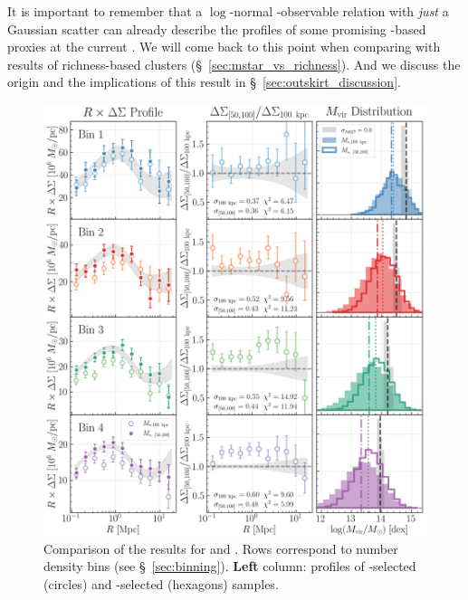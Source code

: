 \documentclass[fleqn,usenatbib,useAMS]{mnras}
\begin{document}
    It is important to remember that a $\log$-normal \mvir{}-observable relation with \emph{just} a
    Gaussian scatter can already describe the \dsigma{} profiles of some promising \mstar{}-based
    \mvir{} proxies at the current \snratio{}.
    We will come back to this point when comparing with \topn{} results of richness-based 
    clusters (\S\ \ref{sec:mstar_vs_richness}). 
    And we discuss the origin and the implications of this result in \S\
    \ref{sec:outskirt_discussion}.
    
\begin{figure}
    \centering
    \includegraphics[width=\textwidth]{figure/fig_6}
    \caption{
        Comparison of the \topn{} results for  and . 
        Rows correspond to number density bins (see \S\ \ref{sec:binning}).  
        \textbf{Left} column: \rdsigma{} profiles of \menve{50}{100}-selected (circles) and
        \maper{100}-selected (hexagons) samples. 
}
\end{figure}
\end{document}
